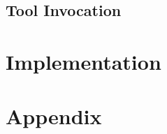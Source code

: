 \documentclass[10pt,oneside]{book}
\begin{document}
\chapter{Tool Invocation}

\part{Implementation}\label{part:imp}

\appendix
\part{Appendix}\label{part:appendix}
%

\printglossary[nonumberlist=true, style=altlist, type=main]




\clearpage
\end{document}
